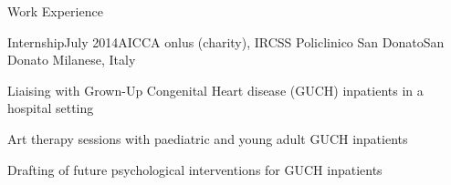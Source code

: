 \documentclass{resume2} %
\begin{document}
\begin{rSection}{Work Experience}
\pagebreak[4] %

\begin{rSubsection}{Internship}{July 2014}{AICCA onlus (charity), IRCSS Policlinico San Donato}{San Donato Milanese, Italy}
\item Liaising with Grown-Up Congenital Heart disease (GUCH) inpatients in a hospital setting
\item Art therapy sessions with paediatric and young adult GUCH inpatients
\item Drafting of future psychological interventions for GUCH inpatients
\end{rSubsection}

\end{rSection}


\end{document}
